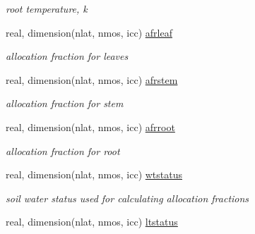 \begin{DoxyCompactItemize}
\begin{DoxyCompactList}\small\item\em root temperature, k \end{DoxyCompactList}\item 
\hypertarget{structctem__statevars_1_1veg__rot_aa96885af24a58015dc7d634b7cc9d64a}{}real, dimension(nlat, nmos, icc) \hyperlink{structctem__statevars_1_1veg__rot_aa96885af24a58015dc7d634b7cc9d64a}{afrleaf}\label{structctem__statevars_1_1veg__rot_aa96885af24a58015dc7d634b7cc9d64a}

\begin{DoxyCompactList}\small\item\em allocation fraction for leaves \end{DoxyCompactList}\item 
\hypertarget{structctem__statevars_1_1veg__rot_a20e329800e712529e44378d11389adbe}{}real, dimension(nlat, nmos, icc) \hyperlink{structctem__statevars_1_1veg__rot_a20e329800e712529e44378d11389adbe}{afrstem}\label{structctem__statevars_1_1veg__rot_a20e329800e712529e44378d11389adbe}

\begin{DoxyCompactList}\small\item\em allocation fraction for stem \end{DoxyCompactList}\item 
\hypertarget{structctem__statevars_1_1veg__rot_a8b12fb097a50cfbcfb3e8d91748f9e99}{}real, dimension(nlat, nmos, icc) \hyperlink{structctem__statevars_1_1veg__rot_a8b12fb097a50cfbcfb3e8d91748f9e99}{afrroot}\label{structctem__statevars_1_1veg__rot_a8b12fb097a50cfbcfb3e8d91748f9e99}

\begin{DoxyCompactList}\small\item\em allocation fraction for root \end{DoxyCompactList}\item 
\hypertarget{structctem__statevars_1_1veg__rot_a80d37f1fc8d7851746406e7543715317}{}real, dimension(nlat, nmos, icc) \hyperlink{structctem__statevars_1_1veg__rot_a80d37f1fc8d7851746406e7543715317}{wtstatus}\label{structctem__statevars_1_1veg__rot_a80d37f1fc8d7851746406e7543715317}

\begin{DoxyCompactList}\small\item\em soil water status used for calculating allocation fractions \end{DoxyCompactList}\item 
\hypertarget{structctem__statevars_1_1veg__rot_a99c134ab79cc4cf5fbd7d6343af9417a}{}real, dimension(nlat, nmos, icc) \hyperlink{structctem__statevars_1_1veg__rot_a99c134ab79cc4cf5fbd7d6343af9417a}{ltstatus}\label{structctem__statevars_1_1veg__rot_a99c134ab79cc4cf5fbd7d6343af9417a}


\end{DoxyCompactItemize}
